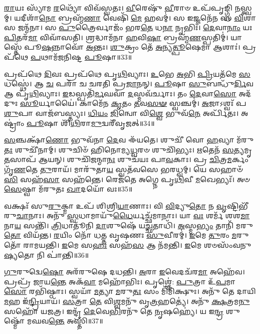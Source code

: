 \-\ul{𑌰𑌾}\-𑌯𑌃 𑌸𑍍𑌯𑌾᳴𑌮 \ul{𑌰}\-𑌥𑍍𑌯𑍋᳴ 𑌵𑌿𑌵᳴𑌸𑍍𑌵𑌤𑌃।
\-\ul{𑌵𑍀}\-𑌰𑍇𑌷𑍁᳴ \ul{𑌵𑍀}\-𑌰𑌾𑍞 𑌉𑌪᳴𑌪𑍃𑌙𑍍𑌗𑍍𑌧𑌿 \ul{𑌨}\-𑌸𑍍𑌤𑍍𑌵𑌮𑍍।
𑌯𑌦𑍀𑌶𑌾᳴\-\ul{𑌨𑍋} 𑌬𑍍𑌰𑌹𑍍𑌮᳴\-\ul{𑌣𑌾} 𑌵𑍇𑌷𑌿᳴ \ul{𑌮𑍇} 𑌹𑌵𑌮𑍍॑।
𑌸 𑌇𑌜𑍍𑌜𑌨𑍇᳴\-\ul{𑌨} 𑌸 \ul{𑌵𑌿}\-𑌶𑌾 𑌸 𑌜𑌨𑍍𑌮᳴𑌨𑌾।
𑌸 \ul{𑌪𑍁}\-𑌤𑍍𑌰𑍈𑌰𑍍𑌵𑌾𑌜𑌂᳴ 𑌭𑌰\-\ul{𑌤𑍇} 𑌧\-\ul{𑌨𑌾} 𑌨𑍃𑌭𑌿𑌃᳴।
\-\ul{𑌦𑍇}\-𑌵𑌾\-\ul{𑌨𑌾𑌂} 𑌯𑌃 \ul{𑌪𑌿}\-𑌤𑌰᳴\-\ul{𑌮𑌾} 𑌵𑌿𑌵𑌾᳴𑌸𑌤𑌿।
\-\ul{𑌶𑍍𑌰}\-𑌦𑍍𑌧𑌾𑌮᳴𑌨𑌾 \ul{𑌹}\-𑌵𑌿\-\ul{𑌷𑌾} 𑌬𑍍𑌰𑌹𑍍𑌮᳴\-\ul{𑌣}\-𑌸𑍍𑌪𑌤𑌿𑌮𑍍॑।
𑌯𑌾𑌸𑍍𑌤𑍇᳴ 𑌪𑍂\-\ul{𑌷}\-𑌨𑍍𑌨𑌾𑌵𑍋᳴ \ul{𑌅}\-𑌨𑍍𑌤𑌃।
\-\ul{𑌶𑍁}\-𑌕𑍍𑌰𑌂 𑌤𑍇᳴ \ul{𑌅}\-𑌨𑍍𑌯\-\ul{𑌤𑍍𑌪𑍂}\-𑌷𑍇𑌮𑌾 𑌆𑌶𑌾𑌃॑।
𑌪𑍍𑌰𑌪᳴𑌥𑍇 \ul{𑌪}\-𑌥𑌾𑌮᳴𑌜𑌨𑌿𑌷𑍍𑌟 \ul{𑌪𑍂}\-𑌷𑌾॥33॥

𑌪𑍍𑌰𑌪᳴𑌥𑍇 \ul{𑌦𑌿}\-𑌵𑌃 𑌪𑍍𑌰𑌪᳴𑌥𑍇 𑌪𑍃\-\ul{𑌥𑌿}\-𑌵𑍍𑌯𑌾𑌃।
\-\ul{𑌉}\-𑌭𑍇 \ul{𑌅}\-𑌭𑌿 \ul{𑌪𑍍𑌰𑌿}\-𑌯𑌤᳴𑌮𑍇 \ul{𑌸}\-𑌧𑌸𑍍𑌥𑍇॑।
𑌆 \ul{𑌚} 𑌪𑌰𑌾᳴ 𑌚 𑌚𑌰𑌤𑌿 𑌪𑍍𑌰\-\ul{𑌜𑌾}\-𑌨𑌨𑍍।
\-\ul{𑌪𑍂}\-𑌷𑌾 \ul{𑌸𑍁}\-𑌬𑌨𑍍𑌧𑍁᳴\-\ul{𑌰𑍍𑌦𑌿}\-𑌵 𑌆 𑌪𑍃᳴\-\ul{𑌥𑌿}\-𑌵𑍍𑌯𑌾𑌃।
\-\ul{𑌇}\-𑌡𑌸𑍍𑌪𑌤𑌿᳴\-\ul{𑌰𑍍𑌮}\-𑌘𑌵𑌾᳴ \ul{𑌦}\-𑌸𑍍𑌮𑌵᳴𑌰𑍍𑌚𑌾𑌃।
𑌤𑌂 \ul{𑌦𑍇}\-𑌵𑌾\-\ul{𑌸𑍋} 𑌅𑌦᳴𑌦𑍁𑌃 \ul{𑌸𑍂}\-𑌰𑍍𑌯𑌾𑌯𑍈॑।
𑌕𑌾𑌮𑍇᳴𑌨 \ul{𑌕𑍃}\-𑌤𑌂 \ul{𑌤}\-𑌵\-\ul{𑌸}\-\-\ul{𑍟} 𑌸𑍍𑌵𑌞𑍍𑌚𑌮𑍍॑।
\-\ul{𑌅}\-𑌜𑌾𑌽𑌶𑍍𑌵𑌃᳴ 𑌪\-\ul{𑌶𑍁}\-𑌪𑌾 𑌵𑌾𑌜᳴𑌬𑌸𑍍𑌤𑍍𑌯𑌃।
\-\ul{𑌧𑌿}\-\-\ul{𑌯𑌂} \ul{𑌜𑌿}\-𑌨𑍍𑌵𑍋 𑌵𑌿\-\ul{𑌶𑍍𑌵𑍇} 𑌭𑍁𑌵᳴\-\ul{𑌨𑍇} 𑌅𑌰𑍍𑌪𑌿᳴𑌤𑌃।
𑌅𑌷𑍍𑌟𑍍𑌰𑌾𑌂॑ \ul{𑌪𑍂}\-𑌷𑌾 𑌶𑌿᳴\-\ul{𑌥𑌿}\-𑌰𑌾\-\ul{𑌮𑍁}\-𑌦𑍍𑌵𑌰𑍀᳴𑌵𑍃𑌜𑌤𑍍॥34॥

\-\ul{𑌸}\-𑌞𑍍𑌚𑌕𑍍𑌷𑌾᳴\-\ul{𑌣𑍋} 𑌭𑍁𑌵᳴𑌨𑌾 \ul{𑌦𑍇}\-𑌵 𑌈᳴𑌯𑌤𑍇।
𑌶𑍁𑌚𑍀᳴ 𑌵𑍋 \ul{𑌹}\-𑌵𑍍𑌯𑌾 𑌮᳴𑌰𑍁\-\ul{𑌤𑌃} 𑌶𑍁𑌚𑍀᳴𑌨𑌾𑌮𑍍।
𑌶𑍁𑌚𑌿𑍞᳴ 𑌹𑌿𑌨𑍋𑌮𑍍𑌯\-\ul{𑌧𑍍𑌵}\-𑌰𑍞 𑌶𑍁𑌚𑌿᳴𑌭𑍍𑌯𑌃।
\-\ul{𑌋}\-𑌤𑍇𑌨᳴ \ul{𑌸}\-𑌤𑍍𑌯𑌮𑍃\-\ul{𑌤}\-𑌸𑌾𑌪᳴ 𑌆𑌯𑌨𑍍।
𑌶𑍁𑌚𑌿᳴𑌜𑌨𑍍𑌮𑌾\-\ul{𑌨𑌃} 𑌶𑍁𑌚᳴𑌯𑌃 𑌪𑌾\-\ul{𑌵}\-𑌕𑌾𑌃।
𑌪𑍍𑌰 \ul{𑌚𑌿}\-𑌤𑍍𑌰\-\ul{𑌮}\-𑌰𑍍𑌕𑌂 𑌗𑍃᳴\-\ul{𑌣}\-𑌤𑍇 \ul{𑌤𑍁}\-𑌰𑌾𑌯᳴।
𑌮𑌾𑌰𑍁᳴𑌤𑌾\-\ul{𑌯} 𑌸𑍍𑌵𑌤᳴𑌵𑌸𑍇 𑌭𑌰𑌧𑍍𑌵𑌮𑍍।
𑌯𑍇 𑌸𑌹𑌾𑍞᳴\-\ul{𑌸𑌿} 𑌸𑌹᳴\-\ul{𑌸𑌾} 𑌸𑌹᳴𑌨𑍍𑌤𑍇।
𑌰𑍇𑌜᳴𑌤𑍇 𑌅𑌗𑍍𑌨𑍇 𑌪𑍃\-\ul{𑌥𑌿}\-𑌵𑍀 \ul{𑌮}\-𑌖𑍇𑌭𑍍𑌯𑌃᳴।
𑌅𑍞\-\ul{𑌸𑍇}\-𑌷𑍍𑌵𑌾 𑌮᳴𑌰𑍁𑌤𑌃 \ul{𑌖𑌾}\-𑌦𑌯𑍋᳴ 𑌵𑌃॥35॥

𑌵𑌕𑍍𑌷𑌃᳴ 𑌸𑍁\-\ul{𑌰𑍁}\-𑌕𑍍𑌮𑌾 𑌉𑌪᳴ 𑌶𑌿𑌶𑍍𑌰𑌿\-\ul{𑌯𑌾}\-𑌣𑌾𑌃।
𑌵𑌿 \ul{𑌵𑌿}\-𑌦𑍍𑌯𑍁\-\ul{𑌤𑍋} 𑌨 \ul{𑌵𑍃}\-𑌷𑍍𑌟𑌿𑌭𑍀᳴ 𑌰𑍁\-\ul{𑌚𑌾}\-𑌨𑌾𑌃।
𑌅𑌨𑍁᳴ \ul{𑌸𑍍𑌵}\-𑌧𑌾𑌮𑌾𑌯𑍁᳴\-\ul{𑌧𑍈}\-𑌰𑍍𑌯𑌚𑍍𑌛᳴𑌮𑌾𑌨𑌾𑌃।
𑌯𑌾 \ul{𑌵𑌃} 𑌶𑌰𑍍𑌮᳴ 𑌶𑌶\-\ul{𑌮𑌾}\-𑌨𑌾\-\ul{𑌯} 𑌸𑌨𑍍𑌤𑌿᳴।
\-\ul{𑌤𑍍𑌰𑌿}\-𑌧𑌾𑌤𑍂᳴𑌨𑌿 \ul{𑌦𑌾}\-𑌶𑍁𑌷𑍇᳴ 𑌯\-\ul{𑌚𑍍𑌛}\-𑌤𑌾𑌧𑌿᳴।
\-\ul{𑌅}\-𑌸𑍍𑌮\-\ul{𑌭𑍍𑌯𑌂} 𑌤𑌾𑌨𑌿᳴ 𑌮𑌰𑍁\-\ul{𑌤𑍋} 𑌵𑌿𑌯᳴𑌨𑍍𑌤।
\-\ul{𑌰}\-𑌯𑌿𑌂 𑌨𑍋᳴ 𑌧𑌤𑍍𑌤 𑌵𑍃𑌷𑌣𑌃 \ul{𑌸𑍁}\-𑌵𑍀𑌰𑌮𑍍॑।
\-\ul{𑌇}\-𑌮𑍇 \ul{𑌤𑍁}\-𑌰𑌂 \ul{𑌮}\-𑌰𑍁𑌤𑍋᳴ 𑌰𑌾𑌮𑌯𑌨𑍍𑌤𑌿।
\-\ul{𑌇}\-𑌮𑍇 𑌸\-\ul{𑌹𑌃} 𑌸𑌹᳴\-\ul{𑌸} 𑌆 𑌨᳴𑌮𑌨𑍍𑌤𑌿।
\-\ul{𑌇}\-𑌮𑍇 𑌶𑍞𑌸𑌂᳴𑌵𑌨𑍁\-\ul{𑌷𑍍𑌯}\-𑌤𑍋 𑌨𑌿 𑌪𑌾॑𑌨𑍍𑌤𑌿॥36॥

\-\ul{𑌗𑍁}\-𑌰𑍁𑌦𑍍𑌵𑍇\-\ul{𑌷𑍋} 𑌅𑌰᳴𑌰𑍁𑌷𑍇 𑌦𑌧𑌨𑍍𑌤𑌿।
\-\ul{𑌅}\-𑌰𑌾 \ul{𑌇}\-𑌵𑍇𑌦𑌚᳴𑌰\-\ul{𑌮𑌾} 𑌅𑌹𑍇᳴𑌵।
𑌪𑍍𑌰𑌪𑍍𑌰᳴ 𑌜𑌾𑌯\-\ul{𑌨𑍍𑌤𑍇} 𑌅𑌕᳴\-\ul{𑌵𑌾} 𑌮𑌹𑍋᳴𑌭𑌿𑌃।
𑌪𑍃𑌶𑍍𑌞𑍇॑: \ul{𑌪𑍁}\-𑌤𑍍𑌰𑌾 𑌉᳴\-\ul{𑌪}\-𑌮𑌾\-\ul{𑌸𑍋} 𑌰𑌭𑌿᳴𑌷𑍍𑌠𑌾𑌃।
𑌸𑍍𑌵𑌯𑌾᳴ \ul{𑌮}\-𑌤𑍍𑌯𑌾 \ul{𑌮}\-𑌰𑍁\-\ul{𑌤𑌃} 𑌸𑌂 𑌮𑌿᳴𑌮𑌿𑌕𑍍𑌷𑍁𑌃।
𑌅𑌨𑍁᳴ 𑌤𑍇 𑌦𑌾𑌯𑌿 \ul{𑌮}\-𑌹 𑌇᳴\-\ul{𑌨𑍍𑌦𑍍𑌰𑌿}\-𑌯𑌾𑌯᳴।
\-\ul{𑌸}\-𑌤𑍍𑌰𑌾 \ul{𑌤𑍇} 𑌵𑌿\-\ul{𑌶𑍍𑌵}\-𑌮𑌨𑍁᳴ 𑌵𑍃\-\ul{𑌤𑍍𑌰}\-𑌹𑌤𑍍𑌯𑍇॑।
𑌅𑌨𑍁᳴ \ul{𑌕𑍍𑌷}\-𑌤𑍍𑌰𑌮\-\ul{𑌨𑍁} 𑌸𑌹𑍋᳴ 𑌯𑌜𑌤𑍍𑌰।
𑌇𑌨𑍍𑌦𑍍𑌰᳴ \ul{𑌦𑍇}\-𑌵𑍇\-\ul{𑌭𑌿}\-𑌰𑌨𑍁᳴ 𑌤𑍇 \ul{𑌨𑍃}\-𑌷𑌹𑍍𑌯𑍇॑।
𑌯 𑌇\-\ul{𑌨𑍍𑌦𑍍𑌰} 𑌶𑍁𑌷𑍍𑌮𑍋᳴ 𑌮𑌘𑌵\-\ul{𑌨𑍍𑌤𑍇} 𑌅𑌸𑍍𑌤𑌿᳴॥37॥

